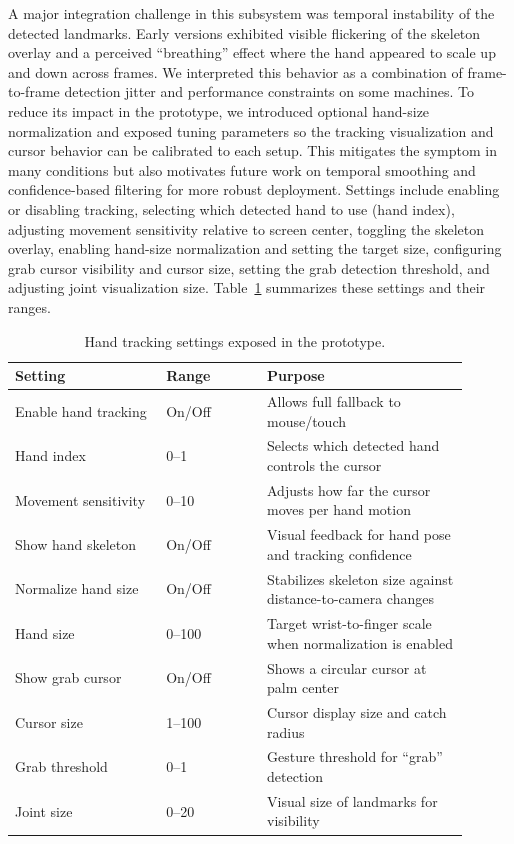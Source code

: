 \documentclass[12pt]{article}
\begin{document}
A major integration challenge in this subsystem was temporal instability of the detected landmarks. Early versions exhibited visible flickering of the skeleton overlay and a perceived ``breathing'' effect where the hand appeared to scale up and down across frames. We interpreted this behavior as a combination of frame-to-frame detection jitter and performance constraints on some machines. To reduce its impact in the prototype, we introduced optional hand-size normalization and exposed tuning parameters so the tracking visualization and cursor behavior can be calibrated to each setup. This mitigates the symptom in many conditions but also motivates future work on temporal smoothing and confidence-based filtering for more robust deployment.
Settings include enabling or disabling tracking, selecting which detected hand to use (hand index), adjusting movement sensitivity relative to screen center, toggling the skeleton overlay, enabling hand-size normalization and setting the target size, configuring grab cursor visibility and cursor size, setting the grab detection threshold, and adjusting joint visualization size. Table~\ref{tab:hand_settings} summarizes these settings and their ranges.

\begin{table}[H]
\centering
\caption{Hand tracking settings exposed in the prototype.}
\label{tab:hand_settings}
\begin{tabular}{p{0.30\linewidth} p{0.20\linewidth} p{0.40\linewidth}}
\toprule
\textbf{Setting} & \textbf{Range} & \textbf{Purpose} \\
\midrule
Enable hand tracking & On/Off & Allows full fallback to mouse/touch \\
Hand index & 0--1 & Selects which detected hand controls the cursor \\
Movement sensitivity & 0--10 & Adjusts how far the cursor moves per hand motion \\
Show hand skeleton & On/Off & Visual feedback for hand pose and tracking confidence \\
Normalize hand size & On/Off & Stabilizes skeleton size against distance-to-camera changes \\
Hand size & 0--100 & Target wrist-to-finger scale when normalization is enabled \\
Show grab cursor & On/Off & Shows a circular cursor at palm center \\
Cursor size & 1--100 & Cursor display size and catch radius \\
Grab threshold & 0--1 & Gesture threshold for ``grab'' detection \\
Joint size & 0--20 & Visual size of landmarks for visibility \\
\bottomrule
\end{tabular}
\end{table}
\end{document}
